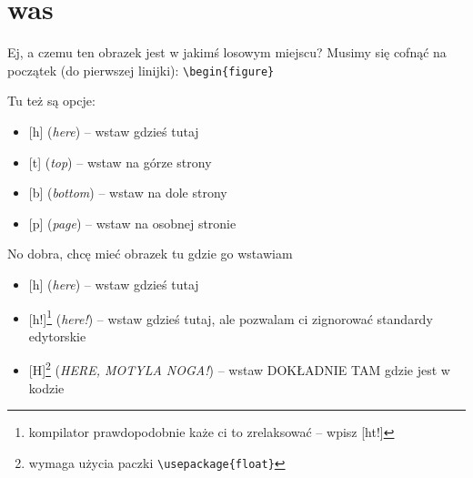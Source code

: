 \documentclass{beamer}
\newcommand{\tb}{\textbackslash}
\begin{document}
\section{was}

\begin{frame}{Ej, a czemu ten obrazek jest w jakimś losowym miejscu?}{}
    Musimy się cofnąć na początek (do pierwszej linijki):
    \texttt{\tb{begin\{figure\}}}
    
    Tu też są opcje:
    \begin{itemize}
        \item{} [h] (\emph{here}) -- wstaw gdzieś tutaj
        \item{} [t] (\emph{top}) -- wstaw na górze strony
        \item{} [b] (\emph{bottom}) -- wstaw na dole strony
        \item{} [p] (\emph{page}) -- wstaw na osobnej stronie
    \end{itemize}
\end{frame}

\begin{frame}{No dobra, chcę mieć obrazek tu gdzie go wstawiam}
    \begin{itemize}
        \item{} [h] (\emph{here}) -- wstaw gdzieś tutaj
        \item{} [h!]\footnote{kompilator prawdopodobnie każe ci to zrelaksować -- wpisz [ht!]} (\emph{here!}) -- wstaw gdzieś tutaj, ale pozwalam ci zignorować standardy edytorskie
        \item{} [H]\footnote{wymaga użycia paczki \texttt{\tb{usepackage\{float\}}}} (\emph{HERE, MOTYLA NOGA!}) -- wstaw DOKŁADNIE TAM gdzie jest w kodzie
    \end{itemize}
\end{frame}
\end{document}
